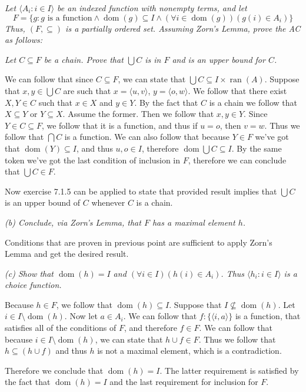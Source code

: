 \documentclass[11pt,oneside,titlepage]{book}
\DeclareMathOperator \dom {dom}
\DeclareMathOperator \ran {ran}
\newcommand{\eangle}[1]{\langle #1 \rangle}
\newcommand{\set}[1]{\{ #1 \}}
\begin{document}
\textit{Let $\eangle{A_i: i \in I}$ be an indexed function with nonempty terms, and let
  $$F = \set{g: g \text{ is a function} \land \dom(g) \subseteq I
    \land (\forall i \in \dom(g))(g(i) \in A_i)}$$
  Thus, $(F, \subseteq)$ is a partially ordered set. Assuming Zorn's Lemma,
  prove the AC as follows: }

\textit{Let $C \subseteq F$ be a chain. Prove that $\bigcup{C}$ is in $F$ and is an upper
  bound for $C$.}

We can follow that since $C \subseteq F$, we can state that $\bigcup{C}
\subseteq I \times \ran(A)$. 
Suppose that $x, y \in \bigcup{C}$ are such that $x = \eangle{u, v}$, $y = \eangle{o, w}$.
We follow that there exist $X, Y \in C$ such that
$x \in X$ and $y \in Y$. By the fact that $C$ is a chain we follow that $X \subseteq Y$
or $Y \subseteq X$. Assume the former. Then we follow that $x, y \in Y$. Since
$Y \in C \subseteq F$,
we follow that it is a function, and thus if $u = o$, then $v = w$. Thus we follow
that $\bigcap{C}$ is a function. We can also follow that because $Y \in F$ we've got that
$\dom(Y) \subseteq I$, and thus $u, o \in I$, therefore $\dom{\bigcup{C}} \subseteq I$.
By the same token we've got the last condition of inclusion in $F$, therefore
we can conclude that $\bigcup{C} \in F$.

Now exercise 7.1.5 can be applied to state that provided result implies that $\bigcup{C}$ is
an upper bound of $C$ whenever $C$ is a chain.

\textit{(b) Conclude, via Zorn's Lemma, that $F$ has a maximal element $h$.}

Conditions that are proven in previous point are sufficient to apply Zorn's Lemma and get the
desired result.

\textit{(c) Show that $\dom(h) = I$ and $(\forall i \in I)(h(i) \in A_i)$. Thus
  $\eangle{h_i: i \in I}$ is a choice function.}

Because $h \in F$, we follow that $\dom(h) \subseteq I$. Suppose that $I \not \subseteq \dom(h)$.
Let  $i \in I \setminus \dom(h)$.
Now let $a \in A_i$. We can follow that $f: \set{\eangle{i, a}}$ is a function, that satisfies
all of the conditions of $F$, and therefore $f \in F$. We can follow  that because
$i \in I \setminus \dom(h)$, we can state that $h \cup f \in F$. Thus we follow that
$h \subseteq (h \cup f)$ and thus $h$ is not a maximal element, which is a contradiction.

Therefore we conclude that $\dom(h) = I$. The latter requirement is satisfied by the fact that
$\dom(h) = I$ and the last requirement for inclusion for $F$.
\end{document}

